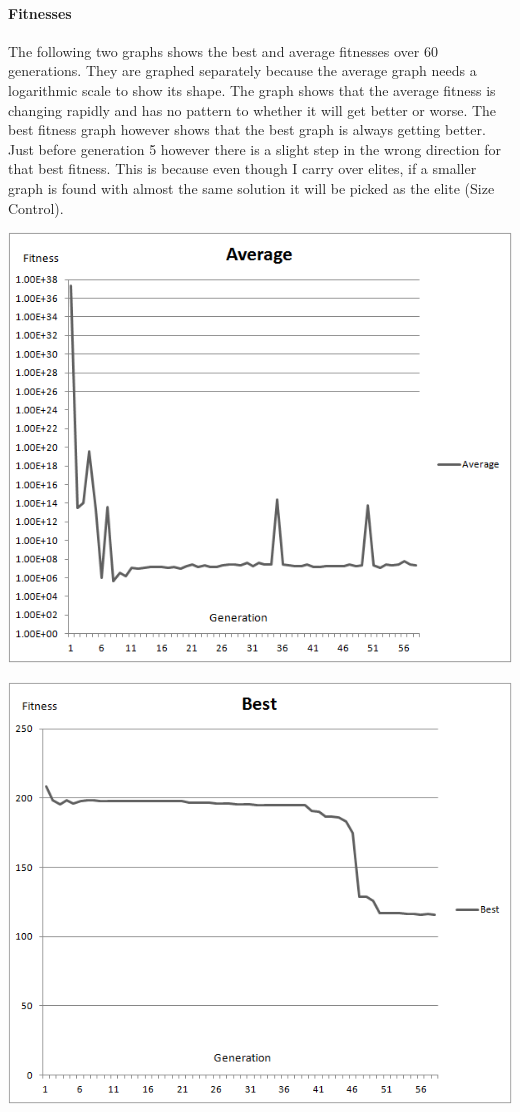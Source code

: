 \documentclass[11pt]{article} %
\begin{document}
\paragraph{Fitnesses} The following two graphs shows the best and average fitnesses over 60 generations. They are graphed separately because the average graph needs a logarithmic scale to show its shape. The graph shows that the average fitness is changing rapidly and has no pattern to whether it will get better or worse. The best fitness graph however shows that the best graph is always getting better. Just before generation 5 however there is a slight step in the wrong direction for that best fitness. This is because even though I carry over elites, if a smaller graph is found with almost the same solution it will be picked as the elite (Size Control).

\begin{center}
\includegraphics[]{Average}
\end{center}
\begin{center}
\includegraphics[]{Best}
\end{center}
\pagebreak
\end{document}
